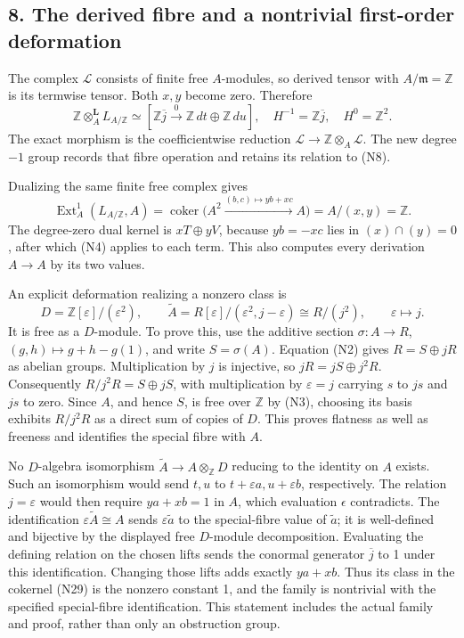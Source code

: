\documentclass[
]{article}
\begin{document}
\subsection{8. The derived fibre and a nontrivial first-order
deformation}\label{the-derived-fibre-and-a-nontrivial-first-order-deformation}

The complex \(\mathcal L\) consists of finite free \(A\)-modules, so
derived tensor with \(A/\mathfrak m=\mathbb Z\) is its termwise tensor.
Both \(x,y\) become zero. Therefore \[
\mathbb Z\otimes_A^{\mathbf L}L_{A/\mathbb Z}
\simeq[\mathbb Z\overline j\xrightarrow{0}\mathbb Z\,dt\oplus\mathbb Z\,du],
\quad H^{-1}=\mathbb Z\overline j,\quad H^0=\mathbb Z^2.
\tag{N28}
\] The exact morphism is the coefficientwise reduction
\(\mathcal L\to\mathbb Z\otimes_A\mathcal L\). The new degree \(-1\)
group records that fibre operation and retains its relation to (N8).

Dualizing the same finite free complex gives \[
\operatorname{Ext}^1_A(L_{A/\mathbb Z},A)
=\operatorname{coker}\bigl(A^2\xrightarrow{(b,c)\mapsto yb+xc}A\bigr)
=A/(x,y)=\mathbb Z.
\tag{N29}
\] The degree-zero dual kernel is \(xT\oplus yV\), because \(yb=-xc\)
lies in \((x)\cap(y)=0\), after which (N4) applies to each term. This
also computes every derivation \(A\to A\) by its two values.

An explicit deformation realizing a nonzero class is \[
D=\mathbb Z[\varepsilon]/(\varepsilon^2),\qquad
\widetilde A=R[\varepsilon]/(\varepsilon^2,j-\varepsilon)
\cong R/(j^2),\qquad\varepsilon\mapsto j.
\tag{N30}
\] It is free as a \(D\)-module. To prove this, use the additive section
\(\sigma:A\to R\), \((g,h)\mapsto g+h-g(1)\), and write \(S=\sigma(A)\).
Equation (N2) gives \(R=S\oplus jR\) as abelian groups. Multiplication
by \(j\) is injective, so \(jR=jS\oplus j^2R\). Consequently
\(R/j^2R=S\oplus jS\), with multiplication by \(\varepsilon=j\) carrying
\(s\) to \(js\) and \(js\) to zero. Since \(A\), and hence \(S\), is
free over \(\mathbb Z\) by (N3), choosing its basis exhibits \(R/j^2R\)
as a direct sum of copies of \(D\). This proves flatness as well as
freeness and identifies the special fibre with \(A\).

No \(D\)-algebra isomorphism \(\widetilde A\to A\otimes_{\mathbb Z}D\)
reducing to the identity on \(A\) exists. Such an isomorphism would send
\(t,u\) to \(t+\varepsilon a,u+\varepsilon b\), respectively. The
relation \(j=\varepsilon\) would then require \(ya+xb=1\) in \(A\),
which evaluation \(\epsilon\) contradicts. The identification
\(\varepsilon\widetilde A\cong A\) sends \(\varepsilon\widetilde a\) to
the special-fibre value of \(\widetilde a\); it is well-defined and
bijective by the displayed free \(D\)-module decomposition. Evaluating
the defining relation on the chosen lifts sends the conormal generator
\(\overline j\) to 1 under this identification. Changing those lifts
adds exactly \(ya+xb\). Thus its class in the cokernel (N29) is the
nonzero constant 1, and the family is nontrivial with the specified
special-fibre identification. This statement includes the actual family
and proof, rather than only an obstruction group.
\end{document}
